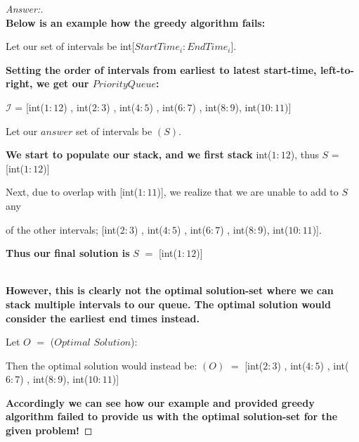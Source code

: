 \documentclass[11pt]{article}
\theoremstyle{definition}
\theoremstyle{definition}
\theoremstyle{definition}
\begin{document}
\begin{proof}[Answer:]
\item \textbf{\\ Below is an example how the greedy algorithm fails:}
\item \hspace*{10mm} Let our set of intervals be int[$StartTime_i:EndTime_i$].
\item \textbf{Setting the order of intervals from earliest to latest start-time, left-to-right, we get our $PriorityQueue$:}
\item \hspace*{10mm} $\mathcal{I}$ = [int($1:12$) , int($2:3$) , int($4:5$) , int($6:7$) , int($8:9$), int($10:11$)]
\item \hspace*{10mm} Let our $answer$ set of intervals be $(S)$.
\item \textbf{We start to populate our stack, and we first stack} int($1:12$), thus $S$ = [int($1:12$)]
\item \hspace*{10mm} Next, due to overlap with [int($1:11$)], we realize that we are unable to add to $S$ any
\item \hspace*{10mm} of the other intervals; [int($2:3$) , int($4:5$) , int($6:7$) , int($8:9$), int($10:11$)].
\item \textbf{Thus our final solution is} $S$ $=$ [int($1:12$)]
\item \textbf{\\ However, this is clearly not the optimal solution-set where we can stack multiple intervals to our queue. The optimal solution would consider the earliest end times instead.}
\item \hspace*{10mm} Let $O$ $=$ ($Optimal$ $Solution$):
\item \hspace*{10mm} Then the optimal solution would instead be: $(O)$ $=$ [int($2:3$) , int($4:5$) , int($6:7$) , int($8:9$), int($10:11$)]
\item \textbf{Accordingly we can see how our example and provided greedy algorithm failed to provide us with the optimal solution-set for the given problem!}
\end{proof}






\newpage
\end{document}
